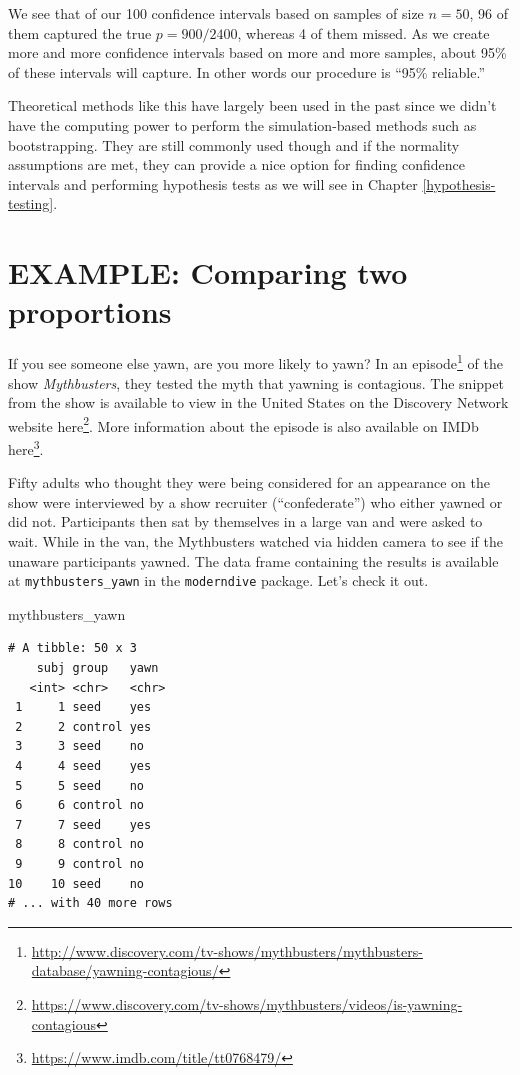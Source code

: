 \documentclass[12pt,]{krantz}
\makeatletter
\newenvironment{Shaded}{\begin{snugshade}}{\end{snugshade}}
\newcommand{\NormalTok}[1]{#1}
\renewcommand{\href}[2]{#2\footnote{\url{#1}}}
\newenvironment{kframe}{%
\medskip{}
\setlength{\fboxsep}{.8em}
 \def\at@end@of@kframe{}%
 \ifinner\ifhmode%
  \def\at@end@of@kframe{\end{minipage}}%
  \begin{minipage}{\columnwidth}%
 \fi\fi%
 \def\FrameCommand##1{\hskip\@totalleftmargin \hskip-\fboxsep
 \colorbox{shadecolor}{##1}\hskip-\fboxsep
     \hskip-\linewidth \hskip-\@totalleftmargin \hskip\columnwidth}%
 \MakeFramed {\advance\hsize-\width
   \@totalleftmargin\z@ \linewidth\hsize
   \@setminipage}}%
 {\par\unskip\endMakeFramed%
 \at@end@of@kframe}
\renewenvironment{Shaded}{\begin{kframe}}{\end{kframe}}
\theoremstyle{definition}
\theoremstyle{definition}
\theoremstyle{definition}
\theoremstyle{remark}
\makeatother
\begin{document}
We see that of our 100 confidence intervals based on samples of size
\(n=50\), 96 of them captured the true \(p = 900/2400\), whereas 4 of
them missed. As we create more and more confidence intervals based on
more and more samples, about 95\% of these intervals will capture. In
other words our procedure is ``95\% reliable.''

Theoretical methods like this have largely been used in the past since
we didn't have the computing power to perform the simulation-based
methods such as bootstrapping. They are still commonly used though and
if the normality assumptions are met, they can provide a nice option for
finding confidence intervals and performing hypothesis tests as we will
see in Chapter \ref{hypothesis-testing}.

\section{EXAMPLE: Comparing two
proportions}\label{example-comparing-two-proportions}

If you see someone else yawn, are you more likely to yawn? In an
\href{http://www.discovery.com/tv-shows/mythbusters/mythbusters-database/yawning-contagious/}{episode}
of the show \emph{Mythbusters}, they tested the myth that yawning is
contagious. The snippet from the show is available to view in the United
States on the Discovery Network website
\href{https://www.discovery.com/tv-shows/mythbusters/videos/is-yawning-contagious}{here}.
More information about the episode is also available on IMDb
\href{https://www.imdb.com/title/tt0768479/}{here}.

Fifty adults who thought they were being considered for an appearance on
the show were interviewed by a show recruiter (``confederate'') who
either yawned or did not. Participants then sat by themselves in a large
van and were asked to wait. While in the van, the Mythbusters watched
via hidden camera to see if the unaware participants yawned. The data
frame containing the results is available at \texttt{mythbusters\_yawn}
in the \texttt{moderndive} package. Let's check it out.

\begin{Shaded}
\begin{Highlighting}[]
\NormalTok{mythbusters_yawn}
\end{Highlighting}
\end{Shaded}

\begin{verbatim}
# A tibble: 50 x 3
    subj group   yawn 
   <int> <chr>   <chr>
 1     1 seed    yes  
 2     2 control yes  
 3     3 seed    no   
 4     4 seed    yes  
 5     5 seed    no   
 6     6 control no   
 7     7 seed    yes  
 8     8 control no   
 9     9 control no   
10    10 seed    no   
# ... with 40 more rows
\end{verbatim}
\end{document}
